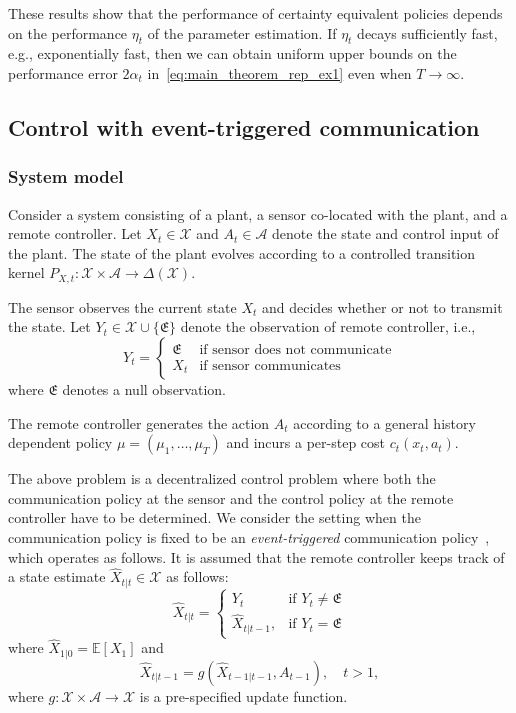 \documentclass[letterpaper, 10pt]{IEEEtran}
\theoremstyle{plain}
\theoremstyle{nonumberplain}
\theoremstyle{plain}
\newcommand*\ALPHABET{\mathcal}
\newcommand*\EXP{\mathds{E}}
\begin{document}
These results show that the performance of certainty equivalent policies depends on the performance $\eta_t$ of the parameter estimation. If $\eta_t$ decays sufficiently fast, e.g., exponentially fast, then we can obtain uniform upper bounds on the performance error $2 \alpha_t$ in~\eqref{eq:main_theorem_rep_ex1} even when $T \to \infty$.

\subsection{Control with event-triggered communication}

\subsubsection{System model}
Consider a system consisting of a plant, a sensor co-located with the plant, and a remote controller. Let $X_t \in \ALPHABET X$ and $A_t \in \ALPHABET A$ denote the state and control input of the plant. The state of the plant evolves according to a controlled transition kernel $P_{X,t} \colon \ALPHABET X \times \ALPHABET A \to \Delta(\ALPHABET X)$. 

The sensor observes the current state $X_t$ and decides whether or not to transmit the state. Let $Y_t \in \ALPHABET X \cup \{ \mathfrak{E} \}$ denote the observation of remote controller, i.e.,
\[
    Y_t = \begin{cases}
        \mathfrak{E} & \text{if sensor does not communicate}\\
        X_t       & \text{if sensor communicates}
    \end{cases}
\]
where $\mathfrak{E}$ denotes a null observation.

The remote controller generates the action $A_t$ according to a general history dependent policy $\mu = (\mu_1, \dots, \mu_T)$ and incurs a per-step cost $c_t(x_t,a_t)$. 

The above problem is a decentralized control problem where both the communication policy at the sensor and the control policy at the remote controller have to be determined. We consider the setting when the communication policy is fixed to be an \emph{event-triggered} communication policy~\cite{molin2014suboptimal, mazo2011decentralized,heemels2012introduction}, which operates as follows. It is assumed that 
the remote controller keeps track of a state estimate $\hat X_{t|t} \in \ALPHABET X$ as follows:
\begin{equation}\label{eq:X-t-t}
    \hat X_{t|t} = \begin{cases}
        Y_t & \text{if } Y_t \neq \mathfrak{E} \\
        \hat X_{t|t-1}, & \text{if } Y_t = \mathfrak{E}
    \end{cases}
\end{equation}
where $\hat X_{1|0} = \EXP[X_1]$ and 
\begin{equation}\label{eq:X-t-t-1}
    \hat X_{t|t-1} = g(\hat X_{t-1|t-1}, A_{t-1}), \quad t > 1,
\end{equation}
where $g \colon \ALPHABET X \times \ALPHABET A \to \ALPHABET X$ is a pre-specified update function.
\end{document}
